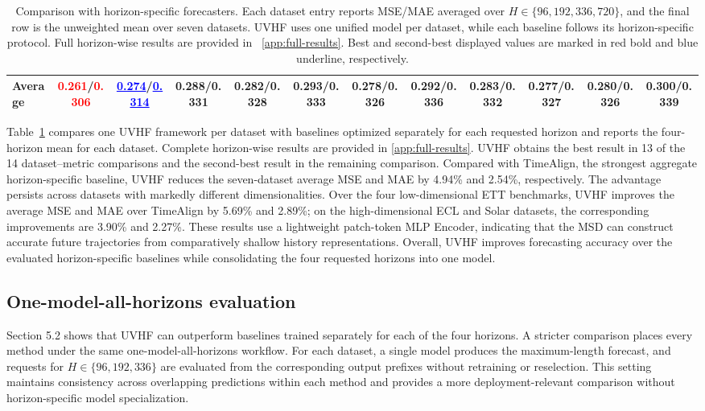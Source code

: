 \documentclass[final,3p,times]{elsarticle}
\newif\ifshowrevisions
\newcommand{\rev}[1]{\ifshowrevisions\textcolor{revisionblue}{#1}\else#1\fi}
\begin{document}
\begin{table}[t]
{\begin{tabular}{l|ccccccccccc}
\midrule
Average & \textcolor{red}{\textbf{0.261}}/\textcolor{red}{\textbf{0.306}} & \textcolor{blue}{\underline{0.274}}/\textcolor{blue}{\underline{0.314}} & 0.288/0.331 & 0.282/0.328 & 0.293/0.333 & 0.278/0.326 & 0.292/0.336 & 0.283/0.332 & 0.277/0.327 & 0.280/0.326 & 0.300/0.339 \\
\bottomrule
\end{tabular}%
}
\caption{Comparison with horizon-specific forecasters. Each dataset entry reports MSE/MAE averaged over $H\in\{96,192,336,720\}$, and the final row is the unweighted mean over seven datasets. \rev{UVHF uses one unified model per dataset}, while each baseline follows its horizon-specific protocol. Full horizon-wise results are provided in ~\ref{app:full-results}. Best and second-best displayed values are marked in red bold and blue underline, respectively.}
\label{tab:main-uvhf}
\end{table}


Table~\ref{tab:main-uvhf} compares one \rev{UVHF framework} per dataset with baselines optimized separately for each requested horizon and reports the four-horizon mean for each dataset. Complete horizon-wise results are provided in \ref{app:full-results}. \rev{UVHF} obtains the best result in 13 of the 14 dataset--metric comparisons and the second-best result in the remaining comparison. Compared with TimeAlign, the strongest aggregate horizon-specific baseline, \rev{UVHF} reduces the seven-dataset average MSE and MAE by 4.94\% and 2.54\%, respectively. The advantage persists across datasets with markedly different dimensionalities. Over the four low-dimensional ETT benchmarks, \rev{UVHF} improves the average MSE and MAE over TimeAlign by 5.69\% and 2.89\%; on the high-dimensional ECL and Solar datasets, the corresponding improvements are 3.90\% and 2.27\%. These results use a lightweight patch-token MLP Encoder, indicating that \rev{the MSD can construct accurate future trajectories from comparatively shallow history representations}. Overall, \rev{UVHF} improves forecasting accuracy over the evaluated horizon-specific baselines while consolidating the four requested horizons into one model.

\subsection{One-model-all-horizons evaluation}
\label{sec:one-model-comparison}


Section 5.2 shows that \rev{UVHF} can outperform baselines trained separately for each of the four horizons. A stricter comparison places every method under the same one-model-all-horizons workflow. For each dataset, a single model produces the maximum-length forecast, and requests for $H\in\{96,192,336\}$ are evaluated from the corresponding output prefixes without retraining or reselection. This setting maintains consistency across overlapping predictions within each method and provides a more deployment-relevant comparison without horizon-specific model specialization.
\end{document}
